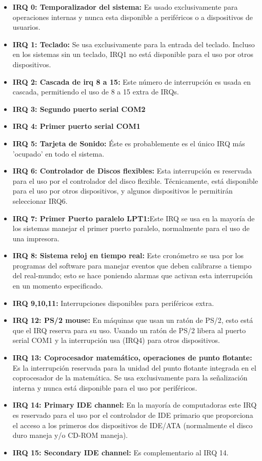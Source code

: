 \documentclass{article}
\begin{document}
\begin{itemize}
    \item \textbf{IRQ 0: Temporalizador del sistema: }  Es usado exclusivamente para operaciones internas y nunca esta disponible a periféricos o a dispositivos de usuarios.
    \item \textbf{IRQ 1: Teclado: }  Se usa exclusivamente para la entrada del teclado. Incluso en los sistemas sin un teclado, IRQ1 no está disponible para el uso por otros dispositivos.
    \item \textbf{IRQ 2: Cascada de irq 8 a 15: } Este número de interrupción es usada en cascada, permitiendo el uso de 8 a 15 extra de IRQs.
    \item \textbf{IRQ 3: Segundo puerto serial COM2}
    \item \textbf{IRQ 4: Primer puerto serial COM1}
    \item \textbf{IRQ 5: Tarjeta de Sonido: }  Éste es probablemente es el único IRQ más 'ocupado' en todo el sistema.
    \item \textbf{IRQ 6: Controlador de Discos flexibles: } Esta interrupción es reservada para el uso por el controlador del disco flexible. Técnicamente, está disponible para el uso por otros dispositivos, y algunos dispositivos le permitirán seleccionar IRQ6.
    \item \textbf{IRQ 7: Primer Puerto paralelo LPT1:}Este IRQ se usa en la mayoría de los sistemas manejar el primer puerto paralelo, normalmente para el uso de una impresora.
    \item \textbf{IRQ 8: Sistema reloj en tiempo real:} Este cronómetro se usa por los programas del software para manejar eventos que deben calibrarse a tiempo del real-mundo; esto se hace poniendo alarmas que activan esta interrupción en un momento especificado.
    \item \textbf{IRQ 9,10,11: }  Interrupciones disponibles para periféricos extra.
    \item \textbf{IRQ 12: PS/2 mouse: }  En máquinas que usan un ratón de PS/2, esto está que el IRQ reserva para su uso. Usando un ratón de PS/2 libera al puerto serial COM1 y la interrupción usa (IRQ4) para otros dispositivos.
    \item \textbf{IRQ 13: Coprocesador matemático, operaciones de punto flotante: } Es la interrupción reservada para la unidad del punto flotante integrada en el coprocesador de la matemática. Se usa exclusivamente para la señalización interna y nunca está disponible para el uso por periféricos.
    \item \textbf{IRQ 14: Primary IDE channel: } En la mayoría de computadoras este IRQ es reservado para el uso por el controlador de IDE primario que proporciona el acceso a los primeros dos dispositivos de IDE/ATA (normalmente el disco duro maneja y/o CD-ROM maneja).
    \item \textbf{IRQ 15: Secondary IDE channel: } Es complementario al IRQ 14.
\end{itemize}


%
%
\end{document}
